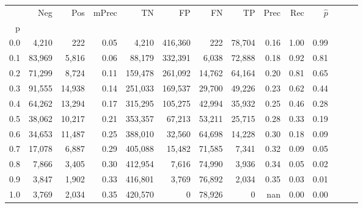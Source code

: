 \begin{tabular}{rrrrrrrrrrrrrr}
\toprule
{} &     Neg &     Pos & mPrec &       TN &       FP &      FN &      TP &  Prec &   Rec & $\hat{p}$ \\
p   &         &         &       &          &          &         &         &       &       &           \\
\midrule
0.0 &   4,210 &     222 &  0.05 &    4,210 &  416,360 &     222 &  78,704 &  0.16 &  1.00 &      0.99 \\
0.1 &  83,969 &   5,816 &  0.06 &   88,179 &  332,391 &   6,038 &  72,888 &  0.18 &  0.92 &      0.81 \\
0.2 &  71,299 &   8,724 &  0.11 &  159,478 &  261,092 &  14,762 &  64,164 &  0.20 &  0.81 &      0.65 \\
0.3 &  91,555 &  14,938 &  0.14 &  251,033 &  169,537 &  29,700 &  49,226 &  0.23 &  0.62 &      0.44 \\
0.4 &  64,262 &  13,294 &  0.17 &  315,295 &  105,275 &  42,994 &  35,932 &  0.25 &  0.46 &      0.28 \\
0.5 &  38,062 &  10,217 &  0.21 &  353,357 &   67,213 &  53,211 &  25,715 &  0.28 &  0.33 &      0.19 \\
0.6 &  34,653 &  11,487 &  0.25 &  388,010 &   32,560 &  64,698 &  14,228 &  0.30 &  0.18 &      0.09 \\
0.7 &  17,078 &   6,887 &  0.29 &  405,088 &   15,482 &  71,585 &   7,341 &  0.32 &  0.09 &      0.05 \\
0.8 &   7,866 &   3,405 &  0.30 &  412,954 &    7,616 &  74,990 &   3,936 &  0.34 &  0.05 &      0.02 \\
0.9 &   3,847 &   1,902 &  0.33 &  416,801 &    3,769 &  76,892 &   2,034 &  0.35 &  0.03 &      0.01 \\
1.0 &   3,769 &   2,034 &  0.35 &  420,570 &        0 &  78,926 &       0 &   nan &  0.00 &      0.00 \\
\bottomrule
\end{tabular}
